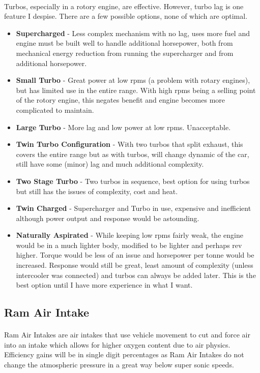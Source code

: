 \documentclass[a4paper,10pt]{report}
\begin{document}
\paragraph*{}Turbos, especially in a rotory engine, are effective. However, turbo lag is one feature I despise. There are a few possible options, none of which are optimal. 
\begin{itemize}
 \item \textbf{Supercharged} - Less complex mechanism with no lag, uses more fuel and engine must be built well to handle additional horsepower, both from mechanical energy reduction from running the supercharger and from additional horsepower.
 \item \textbf{Small Turbo} - Great power at low rpms (a problem with rotary engines), but has limited use in the entire range. With high rpms being a selling point of the rotory engine, this negates benefit and engine becomes more complicated to maintain.
 \item \textbf{Large Turbo} - More lag and low power at low rpms. Unacceptable.
 \item \textbf{Twin Turbo Configuration} - With two turbos that split exhaust, this covers the entire range but as with turbos, will change dynamic of the car, still have some (minor) lag and much additional complexity.
 \item \textbf{Two Stage Turbo} - Two turbos in sequence, best option for using turbos but still has the issues of complexity, cost and heat.
 \item \textbf{Twin Charged} - Supercharger and Turbo in use, expensive and inefficient although power output and response would be astounding.
 \item \textbf{Naturally Aspirated} - While keeping low rpms fairly weak, the engine would be in a much lighter body, modified to be lighter and perhaps rev higher. Torque would be less of an issue and horsepower per tonne would be increased. Response would still be great, least amount of complexity (unless intercooler was connected) and turbos can always be added later. This is the best option until I have more experience in what I want.
\end{itemize}
\subsection{Ram Air Intake}
\paragraph*{}Ram Air Intakes are air intakes that use vehicle movement to cut and force air into an intake which allows for higher oxygen content due to air physics. Efficiency gains will be in single digit percentages as Ram Air Intakes do not change the atmospheric pressure in a great way below super sonic speeds.
\end{document}
